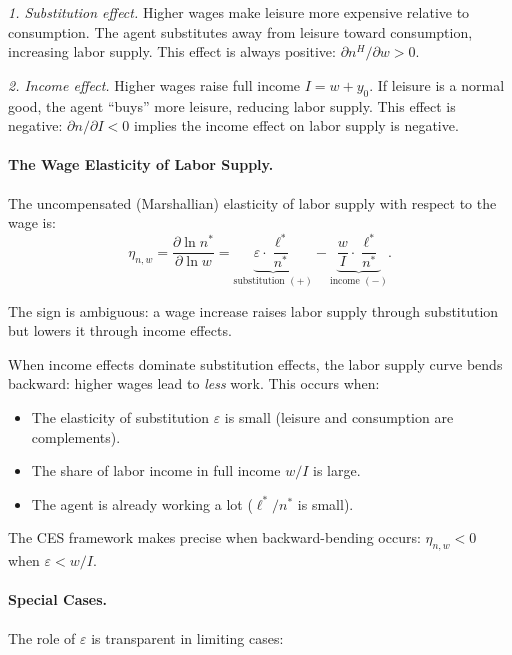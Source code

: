 \medskip
\noindent
\textit{1. Substitution effect.} Higher wages make leisure more expensive relative to consumption. The agent substitutes away from leisure toward consumption, increasing labor supply. This effect is always positive: $\partial n^H / \partial w > 0$.

\medskip
\noindent
\textit{2. Income effect.} Higher wages raise full income $I = w + y_0$. If leisure is a normal good, the agent ``buys'' more leisure, reducing labor supply. This effect is negative: $\partial n / \partial I < 0$ implies the income effect on labor supply is negative.

\paragraph{The Wage Elasticity of Labor Supply.}
The uncompensated (Marshallian) elasticity of labor supply with respect to the wage is:
\begin{equation}
\eta_{n,w} = \frac{\partial \ln n^*}{\partial \ln w} = \underbrace{\varepsilon \cdot \frac{\ell^*}{n^*}}_{\text{substitution } (+)} - \underbrace{\frac{w}{I} \cdot \frac{\ell^*}{n^*}}_{\text{income } (-)}.
\label{eq:labor-elasticity}
\end{equation}

The sign is ambiguous: a wage increase raises labor supply through substitution but lowers it through income effects.

\begin{calloutimportant}
When income effects dominate substitution effects, the labor supply curve bends backward: higher wages lead to \emph{less} work. This occurs when:
\begin{itemize}[nosep]
\item The elasticity of substitution $\varepsilon$ is small (leisure and consumption are complements).
\item The share of labor income in full income $w/I$ is large.
\item The agent is already working a lot ($\ell^*/n^*$ is small).
\end{itemize}
The CES framework makes precise when backward-bending occurs: $\eta_{n,w} < 0$ when $\varepsilon < w/I$.
\end{calloutimportant}

\paragraph{Special Cases.}
The role of $\varepsilon$ is transparent in limiting cases:

